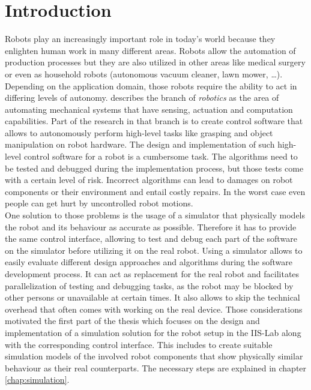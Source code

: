 
\chapter{Introduction}
\label{chap:introduction}

Robots play an increasingly important role in today's world because they enlighten human work in many different areas. Robots allow the automation of production processes but they are also utilized in other areas like medical surgery or even as household robots (autonomous vacuum cleaner, lawn mower, \ldots). Depending on the application domain, those robots require the ability to act in differing levels of autonomy. \citep{lavalle2006} describes the branch of \emph{robotics} as the area of automating mechanical systems that have sensing, actuation and computation capabilities. Part of the research in that branch is to create control software that allows to autonomously perform high-level tasks like grasping and object manipulation on robot hardware. The design and implementation of such high-level control software for a robot is a cumbersome task. The algorithms need to be tested and debugged during the implementation process, but those tests come with a certain level of risk. Incorrect algorithms can lead to damages on robot components or their environment and entail costly repairs. In the worst case even people can get hurt by uncontrolled robot motions.\\

One solution to those problems is the usage of a simulator that physically models the robot and its behaviour as accurate as possible. Therefore it has to provide the same control interface, allowing to test and debug each part of the software on the simulator before utilizing it on the real robot. Using a simulator allows to easily evaluate different design approaches and algorithms during the software development process. It can act as replacement for the real robot and facilitates parallelization of testing and debugging tasks, as the robot may be blocked by other persons or unavailable at certain times. It also allows to skip the technical overhead that often comes with working on the real device. Those considerations motivated the first part of the thesis which focuses on the design and implementation of a simulation solution for the robot setup in the IIS-Lab along with the corresponding control interface. This includes to create suitable simulation models of the involved robot components that show physically similar behaviour as their real counterparts. The necessary steps are explained in chapter \ref{chap:simulation}.\\

